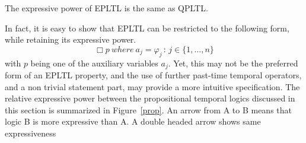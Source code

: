 \begin{lemma}
\label{simplecase}
The expressive power of 
EPLTL is the same as QPLTL.
\end{lemma}
In fact, it is easy to show that EPLTL can be restricted to the following form, while retaining its expressive power.
\[  \Box p {\ where\ } a_j  = \varphi_j \, : \, 
{j \in \{1, \ldots , n\}}  \] 
with $p$ being one of the auxiliary variables $a_j$. Yet, this may not be the preferred form
of an EPLTL property, and the use of further past-time temporal operators, and a non trivial statement  part, may provide a more intuitive specification.
The relative expressive power between the propositional temporal logics discussed in this section is summarized in Figure~\ref{prop}. An arrow from A to B means that logic  B is more expressive than A. A double headed arrow shows same expressiveness

